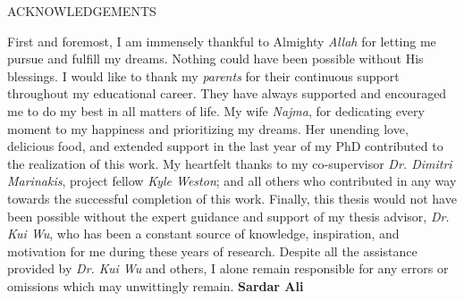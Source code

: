 \newpage
{}

\begin{center}
ACKNOWLEDGEMENTS
\end{center}\begin{flushright}
First and foremost, I am immensely thankful to Almighty \textit{Allah} for
letting me pursue and fulfill my dreams. Nothing could have been
possible without His blessings.
\newline
\newline
I would like to thank my \textit{parents} for their continuous support throughout my
educational career. They have always supported and encouraged me to do my best in all
matters of life.
\newline
\newline
My wife \textit{Najma}, for dedicating every moment to my happiness and prioritizing my dreams. Her unending love, delicious food, and
extended support in the last year of my PhD contributed to the realization of this work.
\newline
\newline
My heartfelt thanks to my co-supervisor \textit{Dr. Dimitri Marinakis}, project fellow \textit{Kyle Weston}; and all
others who contributed in any way towards the successful completion of this work.
\newline
\newline
Finally, this thesis would not have been possible without the expert
guidance and support of my thesis advisor, \textit{Dr. Kui Wu}, who has been a constant
source of knowledge, inspiration, and motivation for me during these years of research. Despite
all the assistance provided by \textit{Dr. Kui Wu} and others, I alone
remain responsible for any errors or omissions which may unwittingly
remain.
\newline
\newline
\newline
\newline
\newline
\textbf{Sardar Ali} \end{flushright}